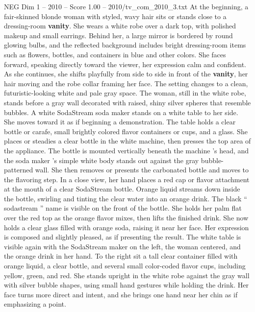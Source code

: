 \begin{textsample}{NEG Dim 1 – 2010 – Score 1.00 – 2010/tv\_com\_2010\_3.txt}  \label{ex:f1_neg_078}
At the beginning, a fair-skinned blonde woman with styled, wavy hair sits or stands close to a dressing-room \textbf{vanity}.
She wears a white robe over a dark top, with polished makeup and small earrings.
Behind her, a large mirror is bordered by round glowing bulbs, and the reflected background includes bright dressing-room items such as flowers, bottles, and containers in blue and other colors.
She faces forward, speaking directly toward the viewer, her expression calm and confident.
As she continues, she shifts playfully from side to side in front of the \textbf{vanity}, her hair moving and the robe collar framing her face.
The setting changes to a clean, futuristic-looking white and pale gray space.
The woman, still in the white robe, stands before a gray wall decorated with raised, shiny silver spheres that resemble bubbles.
A white SodaStream soda maker stands on a white table to her side.
She moves toward it as if beginning a demonstration.
The table holds a clear bottle or carafe, small brightly colored flavor containers or cups, and a glass.
She places or steadies a clear bottle in the white machine, then presses the top area of the appliance.
The bottle is mounted vertically beneath the machine ’s head, and the soda maker ’s simple white body stands out against the gray bubble-patterned wall.
She then removes or presents the carbonated bottle and moves to the flavoring step.
In a close view, her hand places a red cap or flavor attachment at the mouth of a clear SodaStream bottle.
Orange liquid streams down inside the bottle, swirling and tinting the clear water into an orange drink.
The black “ sodastream ” name is visible on the front of the bottle.
She holds her palm flat over the red top as the orange flavor mixes, then lifts the finished drink.
She now holds a clear glass filled with orange soda, raising it near her face.
Her expression is composed and slightly pleased, as if presenting the result.
The white table is visible again with the SodaStream maker on the left, the woman centered, and the orange drink in her hand.
To the right sit a tall clear container filled with orange liquid, a clear bottle, and several small color-coded flavor cups, including yellow, green, and red.
She stands upright in the white robe against the gray wall with silver bubble shapes, using small hand gestures while holding the drink.
Her face turns more direct and intent, and she brings one hand near her chin as if emphasizing a point.

\end{textsample}
